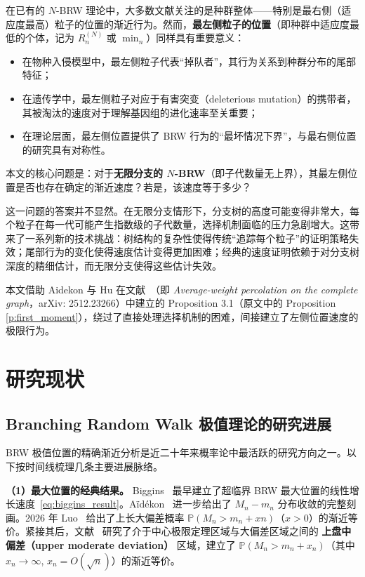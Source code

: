 在已有的 $N$-BRW 理论中，大多数文献关注的是种群整体——特别是最右侧（适应度最高）粒子的位置的渐近行为。然而，\textbf{最左侧粒子的位置}（即种群中适应度最低的个体，记为 $R_n^{(N)}$ 或 $\min_n$）同样具有重要意义：

\begin{itemize}
\item 在物种入侵模型中，最左侧粒子代表``掉队者''，其行为关系到种群分布的尾部特征；
\item 在遗传学中，最左侧粒子对应于有害突变（deleterious mutation）的携带者，其被淘汰的速度对于理解基因组的进化速率至关重要；
\item 在理论层面，最左侧位置提供了 BRW 行为的``最坏情况下界''，与最右侧位置的研究具有对称性。
\end{itemize}

本文的核心问题是：对于\textbf{无限分支的 $N$-BRW}（即子代数量无上界），其最左侧位置是否也存在确定的渐近速度？若是，该速度等于多少？

这一问题的答案并不显然。在无限分支情形下，分支树的高度可能变得非常大，每个粒子在每一代可能产生指数级的子代数量，选择机制面临的压力急剧增大。这带来了一系列新的技术挑战：树结构的复杂性使得传统``追踪每个粒子''的证明策略失效；尾部行为的变化使得速度估计变得更加困难；经典的速度证明依赖于对分支树深度的精细估计，而无限分支使得这些估计失效。

本文借助 Aidekon 与 Hu 在文献~\cite{aidekon_hu_2025}（即 \textit{Average-weight percolation on the complete graph}，arXiv: 2512.23266）中建立的 Proposition 3.1（原文中的 Proposition \ref{p:first_moment}），绕过了直接处理选择机制的困难，间接建立了左侧位置速度的极限行为。

\section{研究现状}
\label{sec:literature_review}

\subsection{Branching Random Walk 极值理论的研究进展}
\label{ssec:brw_extremes}

BRW 极值位置的精确渐近分析是近二十年来概率论中最活跃的研究方向之一。以下按时间线梳理几条主要进展脉络。

\medskip
\noindent
\textbf{（1）最大位置的经典结果。}
Biggins~\cite{biggins1977} 最早建立了超临界 BRW 最大位置的线性增长速度~\eqref{eq:biggins_result}。Aïdékon~\cite{aidekon2013} 进一步给出了 $M_n - m_n$ 分布收敛的完整刻画。2026 年 Luo~\cite{luo2025} 给出了上长大偏差概率 $\mathbb{P}(M_n > m_n + xn)$（$x>0$）的渐近等价。紧接其后，文献~\cite{bramson2026} 研究了介于中心极限定理区域与大偏差区域之间的 \textbf{上盘中偏差（upper moderate deviation）} 区域，建立了 $\mathbb{P}(M_n > m_n + x_n)$（其中 $x_n\to\infty$, $x_n=O(\sqrt{n})$）的渐近等价。

